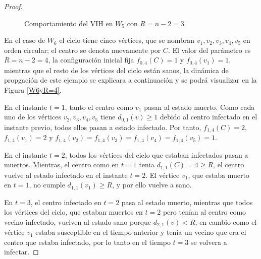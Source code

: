 \documentclass[12pt,titlepage,twoside,openright]{book}
\begin{document}
\begin{proof}
\begin{figure}[h]
    \caption{Comportamiento del VIH en $W_5$ con $R=n-2=3$.}
    \label{W5yR=3}
    \end{figure}

    En el caso de $W_6$ el ciclo tiene cinco v\'ertices, que se nombran $v_1,v_2,v_3,v_4,v_5$ en orden circular; el centro se denota nuevamente por $C$. El valor del par\'ametro es $R=n-2=4$, la configuraci\'on inicial fija $f_{0,4}(C)=1$ y $f_{0,4}(v_1)=1$, mientras que el resto de los v\'ertices del ciclo est\'an sanos, la din\'amica de propgaci\'on de este ejemplo se explicara a continuaci\'on y se podr\'a visualizar en la Figura \ref{W6yR=4}.

    En el instante $t=1$, tanto el centro como $v_1$ pasan al estado muerto. Como cada uno de los v\'ertices $v_2,v_3,v_4,v_5$ tiene $d_{0,1}(v)\geq1$ debido al centro infectado en el instante previo, todos ellos pasan a estado infectado. Por tanto, $f_{1,4}(C)=2$, $f_{1,4}(v_1)=2$ y $f_{1,4}(v_2)=f_{1,4}(v_3)=f_{1,4}(v_4)=f_{1,4}(v_5)=1$.

    En el instante $t=2$, todos los v\'ertices del ciclo que estaban infectados pasan a muertos. Mientras, el centro como en $t=1$ tenia $d_{1,1}(C)=4\ge R$, el centro vuelve al estado infectado en el instante $t=2$. El v\'ertice $v_1$, que estaba muerto en $t=1$, no cumple $d_{1,1}(v_1)\ge R$, y por ello vuelve a sano.

    En $t=3$, el centro infectado en $t=2$ pasa al estado muerto, mientras que todos los v\'ertices del ciclo, que estaban muertos en $t=2$ pero ten\'ian al centro como vecino infectado, vuelven al estado sano porque $d_{2,1}(v)< R$, en cambio como el v\'ertice $v_1$ estaba susceptible en el tiempo anterior y tenia un vecino que era el centro que estaba infectado, por lo tanto en el tiempo $t=3$ se volvera a infectar.


\end{proof}
\end{document}
